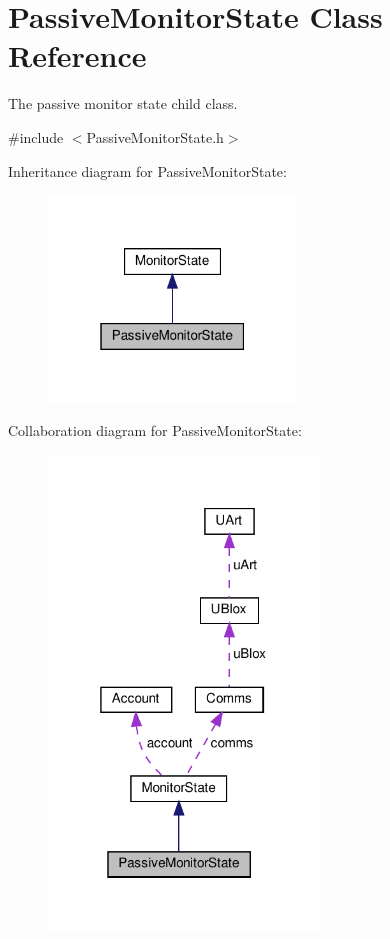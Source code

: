 \hypertarget{class_passive_monitor_state}{}\section{Passive\+Monitor\+State Class Reference}
\label{class_passive_monitor_state}


The passive monitor state child class.  




{\ttfamily \#include $<$Passive\+Monitor\+State.\+h$>$}



Inheritance diagram for Passive\+Monitor\+State\+:\nopagebreak
\begin{figure}[H]
\begin{center}
\leavevmode
\includegraphics[width=187pt]{d2/d78/class_passive_monitor_state__inherit__graph}
\end{center}
\end{figure}


Collaboration diagram for Passive\+Monitor\+State\+:\nopagebreak
\begin{figure}[H]
\begin{center}
\leavevmode
\includegraphics[width=205pt]{db/de8/class_passive_monitor_state__coll__graph}
\end{center}
\end{figure}
